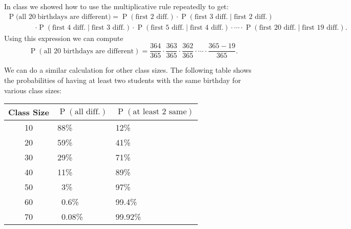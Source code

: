 \documentclass[11pt]{exam}
\DeclareMathOperator*{\Prob}{P}
\renewcommand{\Pr}{\Prob}
\begin{document}
\begin{questions}
\begin{solution}
In class we showed how to use the multiplicative rule repeatedly to get:
\begin{align*}
\Pr(\text{all 20} &\text{ birthdays are different})
  = 
  \Pr(\text{first 2 diff.}) \cdot \Pr(\text{first 3 diff.} \mid \text{first 2 diff.}) \\
  &\cdot \Pr(\text{first 4 diff.} \mid \text{first 3 diff.})
  \cdot \Pr(\text{first 5 diff.} \mid \text{first 4 diff.})
  \cdot \dotsb
  \cdot \Pr(\text{first 20 diff.} \mid \text{first 19 diff.}).
\end{align*}
Using this expression we can compute
\[
\Pr(\text{all 20 birthdays are different})
  =
  \frac{364}{365}
  \cdot \frac{363}{365}
  \cdot \frac{362}{365}
  \cdot \dotsb
  \cdot \frac{365 - 19}{365}.
\]

We can do a similar calculation for other class sizes.
The following table shows the probabilities of having at least two students
with the same birthday for various class sizes:

\vspace{1\baselineskip}
\begin{center}
\begin{tabular}{cll}
\toprule
Class Size & $\Pr(\text{all diff.})$ & $\Pr(\text{at least 2 same})$ \\
\midrule
10 & 88\% & 12\% \\
20 & 59\% & 41\% \\
30 & 29\% & 71\% \\
40 & 11\% & 89\% \\
50 & $\phantom{0}$3\% & 97\% \\
60 & $\phantom{0}$0.6\% & 99.4\% \\
70 & $\phantom{0}$0.08\% & 99.92\% \\
\bottomrule
\end{tabular}
\end{center}
\vspace{1\baselineskip}


\end{solution}


\end{questions}
\end{document}
